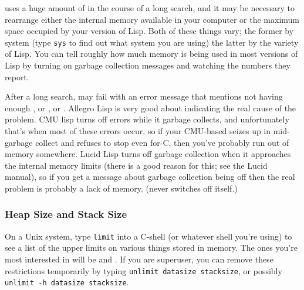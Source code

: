 \TPS uses a huge amount of  in the course of a long search, and it may be necessary 
to rearrange either the internal memory available in your computer or the maximum space
occupied by your version of Lisp. Both of these things vary; the former by system (type {\tt sys} to
find out what system you are using) the latter by the variety of Lisp. You can tell roughly how much memory
is being used in most versions of Lisp by turning on garbage collection messages and watching the numbers
they report.

After a long search, \TPS may fail with an error message that mentions not having enough 
, or , or . Allegro 
Lisp is very good about indicating the real 
cause of the problem. CMU lisp turns off errors while it garbage collects, and unfortunately that's
when most of these errors occur, so if your CMU-based \TPS seizes up in mid-garbage collect and refuses to
stop even for $\hat{}$C, then you've probably run out of memory somewhere. Lucid Lisp turns off garbage 
collection when it approaches the internal memory limits (there is a good reason for this; see 
the Lucid manual), so if you get a message about garbage collection being off then the real
problem is probably a lack of memory. 
(\TPS never switches  off itself.)

\subsubsection{Heap Size and Stack Size}
On a Unix system, type {\tt limit} into a C-shell (or whatever shell you're using) to see a list 
of the upper limits on various things stored in memory. The ones you're most interested in will
be  and . If you are superuser, you can remove these restrictions
temporarily by typing {\tt unlimit datasize stacksize}, or possibly {\tt unlimit -h datasize stacksize}. 

